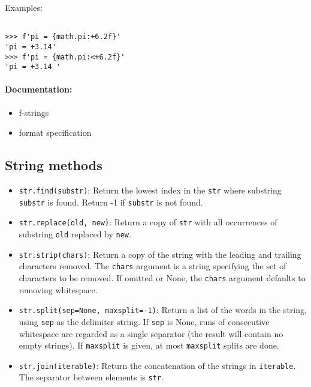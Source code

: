 \documentclass[12pt]{article}
\begin{document}
Examples:
\begin{lstlisting}

>>> f'pi = {math.pi:+6.2f}'
'pi = +3.14'
>>> f'pi = {math.pi:<+6.2f}'
'pi = +3.14 '
\end{lstlisting}



\paragraph{Documentation:}

\begin{itemize}
    \item f-strings
    \item format specification
\end{itemize}

\subsection{String methods}

\begin{itemize}
    \item \texttt{str.find(substr)}: Return the lowest index in the \texttt{str} where substring \texttt{substr} is found. Return -1 if \texttt{substr} is not found.
    \item \texttt{str.replace(old, new)}: Return a copy of \texttt{str} with all occurrences of substring \texttt{old} replaced by \texttt{new}.
    \item \texttt{str.strip(chars)}: Return a copy of the string with the leading and trailing characters removed. The \texttt{chars} argument is a string specifying the set of characters to be removed. If omitted or None, the \texttt{chars} argument defaults to removing whitespace.
\end{itemize}




\begin{itemize}
    \item \texttt{str.split(sep=None, maxsplit=-1)}: Return a list of the words in the string, using \texttt{sep} as the delimiter string. If \texttt{sep} is None, runs of consecutive whitespace are regarded as a single separator (the result will contain no empty strings). If \texttt{maxsplit} is given, at most \texttt{maxsplit} splits are done.
    \item \texttt{str.join(iterable)}: Return the concatenation of the strings in \texttt{iterable}. The separator between elements is \texttt{str}.
\end{itemize}
\end{document}
